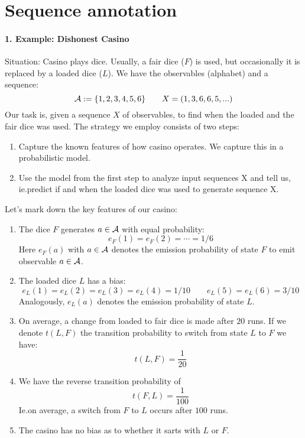 





\section{Sequence annotation}

\paragraph{1. Example: Dishonest Casino}
Situation: Casino plays dice.  Usually, a fair dice (\(F\)) is used, but
occasionally it is replaced by a loaded dice (\(L\)).  We have the observables
(alphabet) and a sequence:
\[
    \mathcal{A} := \{ 1, 2, 3, 4, 5, 6 \} \qquad
    X = (1,3,6,6,5,...)
\]
Our task is, given a sequence \(X\) of observables, to find when the loaded and
the fair dice was used. The strategy we employ consists of two steps:
\begin{enumerate}[label=Step \arabic*.]
\item Capture the known features of how casino operates.  We capture this in
 a probabilistic model.
\item Use the model from the first step to analyze input sequences X and tell
 us, ie.\@ predict if and when the loaded dice was used to generate sequence
 X.
\end{enumerate}

Let's mark down the key features of our casino:
\begin{enumerate}[label=(\alph*)]
\item The dice \(F\) generates \(a\in\mathcal{A}\) with equal probability:
 \[
   e_F(1) = e_F(2) = \dotsb = 1/6
 \]
 Here \(e_F(a)\) with \(a\in\mathcal{A}\) denotes the emission probability
 of state \(F\) to emit observable \(a\in\mathcal{A}\).
\item The loaded dice \(L\) has a bias:
 \[
   e_L(1) = e_L(2) = e_L(3) = e_L(4) = 1/10 \qquad e_L(5) = e_L(6) = 3/10
 \]
 Analogously, \(e_L(a)\) denotes the emission probability of state \(L\).
 \item On average, a change from loaded to fair dice is made after \(20\)
 runs.  If we denote \(t(L,F)\) the transition probability to switch from state
 \(L\) to \(F\) we have:
 \[
   t(L,F) = \frac{1}{20}
 \]
 \item We have the reverse transition probability of
 \[
   t(F,L) = \frac{1}{100}
 \]
 Ie.\@ on average, a switch from \(F\) to \(L\) occurs after \(100\) runs.
 \item The casino has no bias as to whether it sarts with \(L\) or \(F\).
\end{enumerate}

